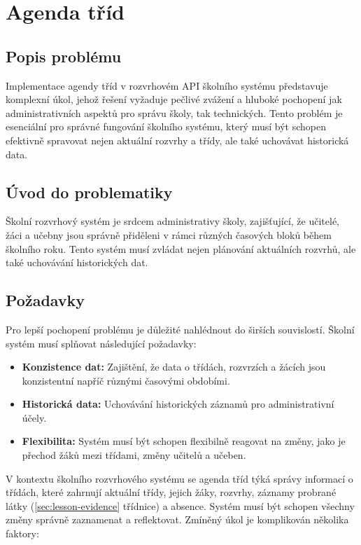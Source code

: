 \chapter{Agenda tříd}
\section{Popis problému}
Implementace agendy tříd v rozvrhovém API školního systému představuje komplexní úkol, jehož řešení vyžaduje pečlivé zvážení a hluboké pochopení jak administrativních aspektů pro správu školy, tak technických. Tento problém je esenciální pro správné fungování školního systému, který musí být schopen efektivně spravovat nejen aktuální rozvrhy a třídy, ale také uchovávat historická data.

\section{Úvod do problematiky}
Školní rozvrhový systém je srdcem administrativy školy, zajišťující, že učitelé, žáci a učebny jsou správně přiděleni v rámci různých časových bloků během školního roku. Tento systém musí zvládat nejen plánování aktuálních rozvrhů, ale také uchovávání historických dat.

\section{Požadavky}
Pro lepší pochopení problému je důležité nahlédnout do širších souvislostí. Školní systém musí splňovat následující požadavky:

\begin{itemize}
    \item \textbf{Konzistence dat:} Zajištění, že data o třídách, rozvrzích a žácích jsou konzistentní napříč různými časovými obdobími.
    \item \textbf{Historická data:} Uchovávání historických záznamů pro administrativní účely.
    \item \textbf{Flexibilita:} Systém musí být schopen flexibilně reagovat na změny, jako je přechod žáků mezi třídami, změny učitelů a učeben.
\end{itemize}

V kontextu školního rozvrhového systému se agenda tříd týká správy informací o třídách, které zahrnují aktuální třídy, jejich žáky, rozvrhy, záznamy probrané látky (\ref{sec:lesson-evidence} třídnice) a absence. Systém musí být schopen všechny změny správně zaznamenat a reflektovat. Zmíněný úkol je komplikován několika faktory:

